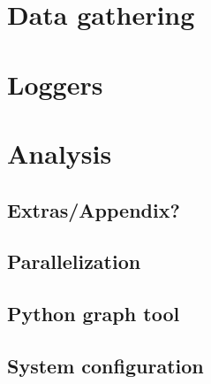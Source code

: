 \section{Data gathering}
	\section{Loggers}
	\section{Analysis}
\clearpage
\subsection{Extras/Appendix?}
	\subsection{Parallelization}
	\subsection{Python graph tool}
	\subsection{System configuration}
\clearpage
	